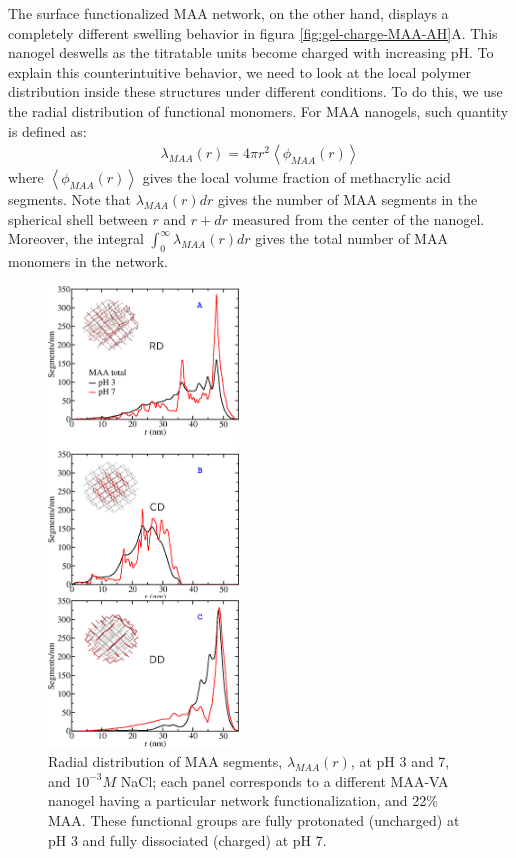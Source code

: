 The surface functionalized MAA network, on the other hand, displays a completely different swelling behavior in figura \ref{fig:gel-charge-MAA-AH}A.
This nanogel deswells as the titratable units become charged with increasing pH.
To explain this counterintuitive behavior, we need to look at the local polymer distribution inside these structures under different conditions.
To do this, we use the radial distribution of functional monomers.
For MAA nanogels, such quantity is  defined as:
%
\begin{align}
    \lambda_{MAA}(r)= 4\pi r^2\left<\phi_{MAA}(r)\right>
\end{align}
%
\noindent where $\left<\phi_{MAA}(r)\right>$ gives the local volume fraction of methacrylic acid segments.
Note that  $\lambda_{MAA}(r) dr$ gives the number of MAA segments in the spherical shell between $r$ and $r+dr$ measured from the center of the nanogel.
Moreover, the integral $\int_0^\infty \lambda_{MAA}(r) dr$ gives the total number of MAA monomers in the network.




\begin{figure}[!htb]
     \centering
     \includegraphics[width=0.45\textwidth]{Figures/graphs-gel2/dist-MAA.png}
     \caption{Radial distribution of MAA segments, $\lambda_{MAA}(r)$,  at pH 3 and 7, and $10^{-3}M$ NaCl; each panel corresponds to a different MAA-VA nanogel having a particular network functionalization, and 22\% MAA.
     These functional groups are fully protonated (uncharged) at pH 3 and fully dissociated (charged) at pH 7.}
     \label{fig:MAA-vs-r-distribution}
 \end{figure}

